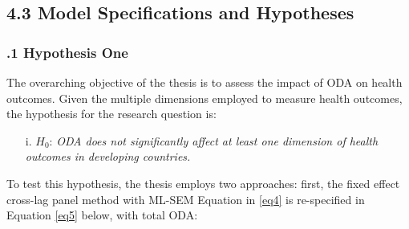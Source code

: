 




\subsection*{4.3  Model Specifications and Hypotheses}
\subsubsection*{.1 Hypothesis One}
The overarching objective of the thesis is to assess the impact of ODA on health outcomes. Given the multiple dimensions employed to measure health outcomes, the hypothesis for the research question is:

\begin{itemize}
    \item[i.] \(H_0\): \textit{ODA does not significantly affect at least one dimension of health outcomes in developing countries.}
\end{itemize}
To test this hypothesis, the thesis employs two approaches: first, the fixed effect cross-lag panel method with ML-SEM Equation in \ref{eq4} is re-specified in Equation \ref{eq5} below, with total ODA:   

